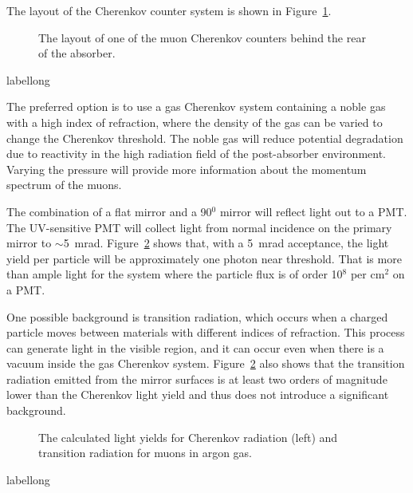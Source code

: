 The layout of the Cherenkov counter system is shown in
Figure~\ref{fig:CherenkovCounterLayout}.

\begin{figure}[htbp]
\begin{center}
\caption[Cherenkov counter layout]{The layout of one of the muon 
Cherenkov counters behind the rear of the absorber.}
\label{fig:CherenkovCounterLayout}
\end{center}
\end{figure}
\begin{cdrfigure}[short]{label}{long}
\end{cdrfigure}

The preferred option is to use a gas Cherenkov system containing a
noble gas with a high index of refraction, where the density of the
gas can be varied to change the Cherenkov threshold. The noble gas
will reduce potential degradation due to reactivity in the high
radiation field of the post-absorber environment. Varying the pressure
will provide more information about the momentum spectrum of the
muons.

The combination of a flat mirror and a 90$^0$ mirror will reflect
light out to a PMT. The UV-sensitive PMT will collect light from
normal incidence on the primary mirror to $\sim$5~mrad. Figure~\ref{fig:LightYield} 
shows that, with a 5~mrad acceptance, the light
yield per particle will be approximately one photon near
threshold. That is more than ample light for the system where the
particle flux is of order 10$^8$ per cm$^2$ on a PMT. 

One possible background is transition radiation, which occurs when a charged particle moves between materials with different indices of refraction.  This process can generate light in the visible region, and it can occur even when there is a vacuum inside the gas Cherenkov system.
Figure~\ref{fig:LightYield} also shows that the transition radiation
emitted from the mirror surfaces is at least two orders of
magnitude lower than the Cherenkov light yield and thus does not introduce a
significant background.

\begin{figure}[htbp]
\centering
\caption[Cherenkov and Transition Radiation Yields]{ The calculated light yields for Cherenkov radiation (left) and transition radiation for muons in argon gas.}
\label{fig:LightYield}
\end{figure}
\begin{cdrfigure}[short]{label}{long}
\end{cdrfigure}

